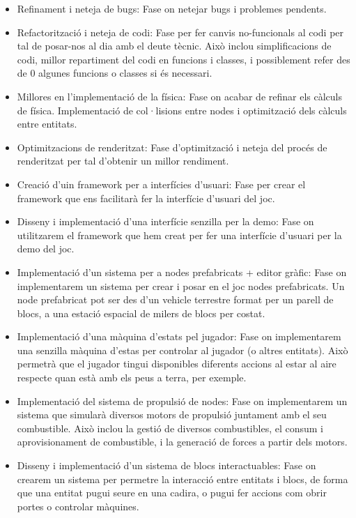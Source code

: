 \begin{itemize}
  \item{Refinament i neteja de bugs: }Fase on netejar bugs i problemes pendents.
  \item{Refactorització i neteja de codi: }Fase per fer canvis no-funcionals al codi per tal de posar-nos al dia amb el deute tècnic. Això inclou simplificacions de codi, millor repartiment del codi en funcions i classes, i possiblement refer des de 0 algunes funcions o classes si és necessari.
  \item{Millores en l'implementació de la física: }Fase on acabar de refinar els càlculs de física. Implementació de col·lisions entre nodes i optimització dels càlculs entre entitats.
  \item{Optimitzacions de renderitzat: }Fase d'optimització i neteja del procés de renderitzat per tal d'obtenir un millor rendiment.
  \item{Creació d'uin framework per a interfícies d'usuari: }Fase per crear el framework que ens facilitarà fer la interfície d'usuari del joc.
  \item{Disseny i implementació d'una interfície senzilla per la demo: }Fase on utilitzarem el framework que hem creat per fer una interfície d'usuari per la demo del joc.
  \item{Implementació d'un sistema per a nodes prefabricats + editor gràfic: }Fase on implementarem un sistema per crear i posar en el joc nodes prefabricats. Un node prefabricat pot ser des d'un vehicle terrestre format per un parell de blocs, a una estació espacial de milers de blocs per costat.
  \item{Implementació d'una màquina d'estats pel jugador: }Fase on implementarem una senzilla màquina d'estas per controlar al jugador (o altres entitats). Això permetrà que el jugador tingui disponibles diferents accions al estar al aire respecte quan està amb els peus a terra, per exemple.
  \item{Implementació del sistema de propulsió de nodes: }Fase on implementarem un sistema que simularà diversos motors de propulsió juntament amb el seu combustible. Això inclou la gestió de diversos combustibles, el consum i aprovisionament de combustible, i la generació de forces a partir dels motors.
  \item{Disseny i implementació d'un sistema de blocs interactuables: }Fase on crearem un sistema per permetre la interacció entre entitats i blocs, de forma que una entitat pugui seure en una cadira, o pugui fer accions com obrir portes o controlar màquines.

\end{itemize}
